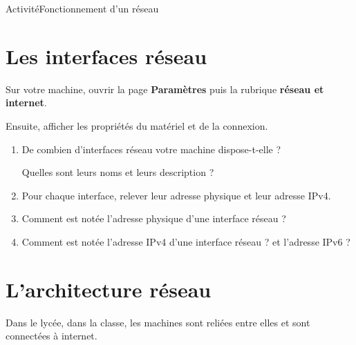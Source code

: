 \documentclass[12pt,a4paper]{article}
\begin{document}
\begin{NSI}
{Activité}{Fonctionnement d'un réseau}
\end{NSI}



\section*{Les interfaces réseau}
Sur votre machine, ouvrir la page \textbf{Paramètres} puis la rubrique \textbf{réseau et internet}. 

Ensuite, afficher les propriétés du matériel et de la connexion.
\begin{enumerate}
\item De combien d'interfaces réseau votre machine dispose-t-elle ? 

Quelles sont leurs noms et leurs description ? \vspace{4cm}

\item Pour chaque interface, relever leur adresse physique et leur adresse IPv4. \vspace{4cm}

\item Comment est notée l'adresse physique d'une interface réseau ?\vspace{4cm}

\item Comment est notée l'adresse IPv4 d'une interface réseau ? et l'adresse IPv6 ? \vspace{4cm}

\end{enumerate}

\newpage
\section*{L'architecture réseau}
Dans le lycée, dans la classe, les machines sont reliées entre elles et sont connectées à internet.
\end{document}
